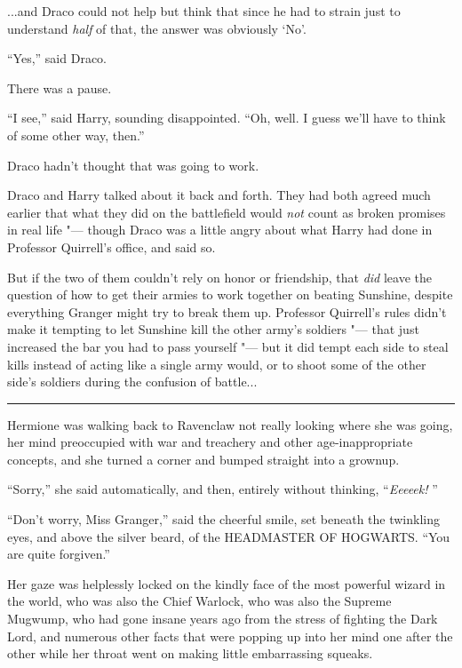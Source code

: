 ...and Draco could not help but think that since he had to strain
just to understand \emph{half} of that, the answer was obviously `No'.

``Yes,'' said Draco.

There was a pause.

``I see,'' said Harry, sounding disappointed. ``Oh, well. I guess we'll
have to think of some other way, then.''

Draco hadn't thought that was going to work.

Draco and Harry talked about it back and forth. They had both agreed
much earlier that what they did on the battlefield would \emph{not}
count as broken promises in real life "--- though Draco was a little angry
about what Harry had done in Professor Quirrell's office, and said so.

But if the two of them couldn't rely on honor or friendship, that
\emph{did} leave the question of how to get their armies to work
together on beating Sunshine, despite everything Granger might try to
break them up. Professor Quirrell's rules didn't make it tempting to let
Sunshine kill the other army's soldiers "--- that just increased the bar
you had to pass yourself "--- but it did tempt each side to steal kills
instead of acting like a single army would, or to shoot some of the
other side's soldiers during the confusion of battle...

\begin{center}\rule{3in}{0.4pt}\end{center}

Hermione was walking back to Ravenclaw not really looking where she was
going, her mind preoccupied with war and treachery and other
age-inappropriate concepts, and she turned a corner and bumped straight
into a grownup.

``Sorry,'' she said automatically, and then, entirely without thinking,
``\emph{Eeeeek!} ''

``Don't worry, Miss Granger,'' said the cheerful smile, set beneath the
twinkling eyes, and above the silver beard, of the HEADMASTER OF
HOGWARTS. ``You are quite forgiven.''

Her gaze was helplessly locked on the kindly face of the most powerful
wizard in the world, who was also the Chief Warlock, who was also the
Supreme Mugwump, who had gone insane years ago from the stress of
fighting the Dark Lord, and numerous other facts that were popping up
into her mind one after the other while her throat went on making little
embarrassing squeaks.

